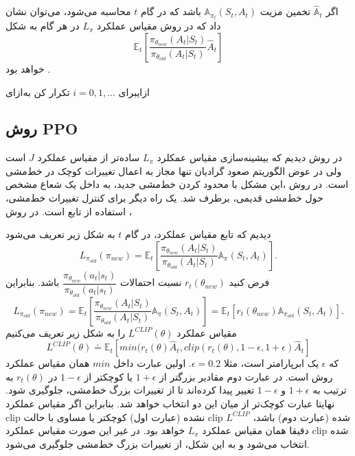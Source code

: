 اگر $\hat{\mathbb{A}}_t$ تخمین مزیت 
$\mathbb{A}_{\pi_t}(S_t, A_t)$
باشد که در گام $t$ محاسبه می‌شود، می‌توان نشان داد که در روش
مقیاس عملکرد $L_\pi$ در هر گام به شکل
$$\mathbb{E}_t\left[\dfrac{\pi_{\theta_{new}}(A_t| S_t)}{\pi_{\theta_{old}}(A_t|S_t)} \hat{A}_t \right]$$خواهد بود
\cite{schulman2015trust}.


‌ازای{برای 
	$i=0,1,...$
	تکرار کن}
‌به‌ازای

\subsection{روش PPO}
در روش  دیدیم که بیشینه‌سازی مقیاس عمکلرد $L_\pi$ ساده‌تر از مقیاس عملکرد $J$ است ولی در عوض الگوریتم صعود گرادیان تنها مجاز به اعمال تغییرات کوچک در خط‌مشی است. در روش 
،این مشکل با محدود کردن خط‌مشی جدید، به داخل یک شعاع مشخص حول خط‌مشی قدیمی، برطرف شد. یک راه دیگر برای کنترل تغییرات خط‌مشی، استفاده از تابع
  است. در روش
،

دیدیم که تابع مقیاس عملکرد، در گام $t$ به شکل زیر تعریف می‌شود
$$L_{\pi_{old}}(\pi_{new}) = \mathbb{E}_t \left[\dfrac{\pi_{\theta_{new}}(A_t| S_t)}{\pi_{\theta_{old}}(A_t|S_t)} \mathbb{A}_{\pi}(S_t, A_t)\right].$$
فرض کنید 
$r_t(\theta_{new})$
نسبت احتمالات 
$\dfrac{\pi_{\theta_{new}}(a_t|s_t)}{\pi_{\theta_{old}}(a_t|s_t)}$
 باشد. بنابراین
$$L_{\pi_{old}}(\pi_{new}) = \mathbb{E}_t \left[\dfrac{\pi_{\theta_{new}}(A_t| S_t)}{\pi_{\theta_{old}}(A_t|S_t)} \mathbb{A}_{\pi}(S_t, A_t)\right] = \mathbb{E}_t\left[r_t(\theta_{new}) \mathbb{A}_{\pi_{old}}(S_t,A_t)\right].$$
 مقیاس عملکرد 
 $L^{CLIP}(\theta)$
  را به شکل زیر تعریف می‌کنیم
$$L^{CLIP}(\theta) \doteq \mathbb{E}_t\left[min(r_t(\theta) \hat{A}_t, clip(r_t(\theta), 1-\epsilon, 1+\epsilon) \hat{A}_t \right]$$
که $\epsilon$ یک ابرپارامتر
است، مثلا 
$\epsilon=0.2$.
 اولین عبارت داخل
$min$
   همان مقیاس عملکرد روش  است. در عبارت دوم مقادیر بزرگتر از $1+\epsilon$ یا کوچکتر از 
$1-\epsilon$
در $r_t(\theta)$ به ترتیب به $1+\epsilon$ و $1-\epsilon$ تغییر پیدا کرده‌اند تا  از تغییرات بزرگ خط‌مشی، جلوگیری شود. نهایتا عبارت کوچک‌تر از میان این دو انتخاب خواهد شد. بنابراین اگر مقیاس عملکرد clip نشده (عبارت اول) کوچکتر یا مساوی با حالت clip شده (عبارت دوم) باشد، $L^{CLIP}$ دقیقا همان مقیاس عملکرد $L_\pi$ خواهد بود. در غیر این صورت مقیاس عملکرد clip شده انتخاب می‌شود  و به این شکل، از تغییرات بزرگ خط‌مشی جلوگیری می‌شود.

